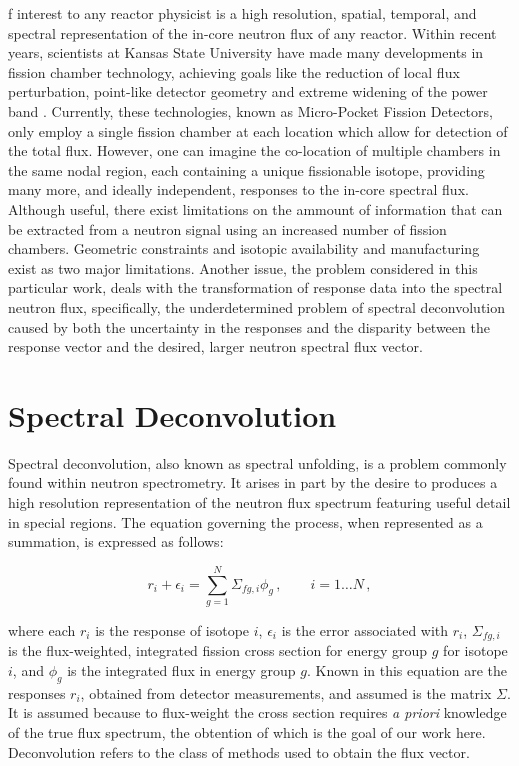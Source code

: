 \documentclass[journal]{IEEEtran}
\begin{document}
f interest to any reactor physicist is a high resolution, spatial, temporal, and spectral representation of the in-core neutron flux of any reactor.
Within recent years, scientists at Kansas State University have made many developments in fission chamber technology, achieving goals like the reduction of local flux perturbation, point-like detector geometry and extreme widening of the power band \cite{reichenberger2016micro} \cite{reichenberger2018fabrication}.
Currently, these technologies, known as Micro-Pocket Fission Detectors, only employ a single fission chamber at each location which allow for detection of the total flux.
However, one can imagine the co-location of multiple chambers in the same nodal region, each containing a unique fissionable isotope, providing many more, and ideally independent, responses to the in-core spectral flux.
Although useful, there exist limitations on the ammount of information that can be extracted from a neutron signal using an increased number of fission chambers.
Geometric constraints and isotopic availability and manufacturing exist as two major limitations.
Another issue, the problem considered in this particular work, deals with the transformation of response data into the spectral neutron flux, specifically, the underdetermined problem of spectral deconvolution caused by both the uncertainty in the responses and the disparity between the response vector and the desired, larger neutron spectral flux vector.


\section{Spectral Deconvolution}

Spectral deconvolution, also known as spectral unfolding, is a problem commonly found within neutron spectrometry.
It arises in part by the desire to produces a high resolution representation of the neutron flux spectrum featuring useful detail in special regions.
The equation governing the process, when represented as a summation, is expressed as follows:

\begin{equation}
  r_i + \epsilon_i = \sum_{g=1}^{N} \Sigma_{fg,i}  \phi_g\, , 
    \qquad i = 1 \ldots N \, ,
\label{eq:response}
\end{equation}

where each $r_i$ is the response of isotope $i$, $\epsilon_i$ is the error associated with $r_i$, $\Sigma_{fg,i}$ is the flux-weighted, integrated fission cross section for energy group $g$ for isotope $i$, and $\phi_g$ is the integrated flux in energy group $g$.
Known in this equation are the responses $r_i$, obtained from detector measurements, and assumed is the matrix $\Sigma$.
It is assumed because to flux-weight the cross section requires {\it a priori} knowledge of the true flux spectrum, the obtention of which is the goal of our work here.
Deconvolution refers to the class of methods used to obtain the flux vector.
\end{document}
